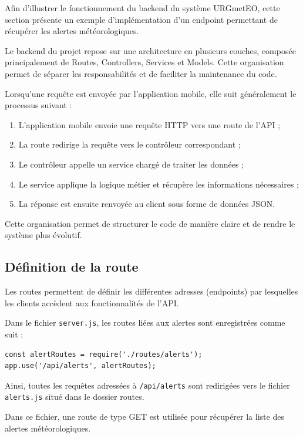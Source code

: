 \noindent Afin d’illustrer le fonctionnement du backend du système URGmetEO, cette section présente un exemple d’implémentation d’un endpoint permettant de récupérer les alertes météorologiques.

\noindent Le backend du projet repose sur une architecture en plusieurs couches, composée principalement de Routes, Controllers, Services et Models. Cette organisation permet de séparer les responsabilités et de faciliter la maintenance du code.

\noindent Lorsqu’une requête est envoyée par l’application mobile, elle suit généralement le processus suivant :
\begin{enumerate}
\item L’application mobile envoie une requête HTTP vers une route de l’API ;
\item La route redirige la requête vers le contrôleur correspondant ;
\item Le contrôleur appelle un service chargé de traiter les données ;
\item Le service applique la logique métier et récupère les informations nécessaires ;
\item La réponse est ensuite renvoyée au client sous forme de données JSON.
\end{enumerate}

\noindent Cette organisation permet de structurer le code de manière claire et de rendre le système plus évolutif.

\subsection{Définition de la route}

\noindent Les routes permettent de définir les différentes adresses (endpoints) par lesquelles les clients accèdent aux fonctionnalités de l’API.

\noindent Dans le fichier \texttt{server.js}, les routes liées aux alertes sont enregistrées comme suit :

\begin{verbatim}
const alertRoutes = require('./routes/alerts');
app.use('/api/alerts', alertRoutes);
\end{verbatim}

\noindent Ainsi, toutes les requêtes adressées à \texttt{/api/alerts} sont redirigées vers le fichier \texttt{alerts.js} situé dans le dossier routes.

\noindent Dans ce fichier, une route de type GET est utilisée pour récupérer la liste des alertes météorologiques.

